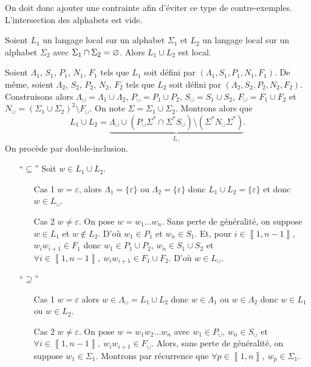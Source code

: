 On doit donc ajouter une contrainte afin d'éviter ce type de contre-exemples.
L'intersection des alphabets est vide.

\begin{prop}
	Soient $L_1$\/ un langage local sur un alphabet $\Sigma_1$\/ et $L_2$\/ un langage local sur un alphabet $\Sigma_2$\/ avec $\Sigma_1 \cap \Sigma_2 = \varnothing$.
	Alors $L_1 \cup L_2$\/ est local.
\end{prop}

\begin{prv}
	Soient $\Lambda_1$, $S_1$, $P_1$, $N_1$, $F_1$\/ tels que $L_1$\/ soit défini par $(\Lambda_1, S_1, P_1, N_1, F_1)$.
	De même, soient $\Lambda_2$, $S_2$, $P_2$, $N_2$, $F_2$\/ tels que $L_2$\/ soit défini par $(\Lambda_2, S_2, P_2, N_2, F_2)$.
	Construisons alors $\Lambda_\cup = \Lambda_1 \cup \Lambda_2$, $P_\cup = P_1 \cup P_2$, $S_\cup = S_1 \cup S_2$, $F_\cup = F_1 \cup F_2$ et $N_\cup = (\Sigma_1 \cup \Sigma_2)^2 \setminus F_\cup$. On note $\Sigma = \Sigma_1 \cup \Sigma_2$.
	Montrons alors que \[
		L_1 \cup L_2 = \underbrace{\Lambda_\cup \cup (P_\cup \Sigma^* \cap \Sigma^* S_\cup) \setminus (\Sigma^* N_\cup \Sigma^*)}_{L_\cup}
	.\]
	On procède par double-inclusion.
	\begin{itemize}
		\item[``$\subseteq$''] Soit $w \in L_1 \cup L_2$.
			\begin{itemize}
				\item[{\sc Cas 1}] $w = \varepsilon$, alors $\Lambda_1 = \{\varepsilon\}$\/ ou $\Lambda_2 = \{\varepsilon\}$\/ donc $L_1 \cup L_2 = \{\varepsilon\}$\/ et donc $w \in L_\cup$.
				\item[{\sc Cas 2}] $w \neq \varepsilon$. On pose $w = w_1\ldots w_n$. Sans perte de généralité, on suppose $w \in L_1$\/ et $w \not\in L_2$. D'où $w_1 \in P_1$\/ et $w_n \in S_1$.
					Et, pour $i \in \left\llbracket 1,n-1 \right\rrbracket$, $w_iw_{i+1} \in F_1$\/ donc $w_1 \in P_1 \cup P_2$, $w_n  \in S_1 \cup S_2$\/ et $\forall i \in \left\llbracket 1,n-1 \right\rrbracket,\: w_i w_{i+1} \in F_1 \cup F_2$.
					D'où $w \in L_\cup$.
			\end{itemize}
		\item[``$\supseteq$'']
			\begin{itemize}
				\item[{\sc Cas 1}] $w = \varepsilon$\/ alors $w \in \Lambda_\cup = L_1 \cup L_2$\/ donc $w \in \Lambda_1$\/ ou $w \in \Lambda_2$\/ donc $w \in L_1$\/ ou $w \in L_2$.
				\item[{\sc Cas 2}] $w \neq \varepsilon$. On pose $w = w_1 w_2 \ldots w_n$\/ avec $w_1 \in P_\cup$, $w_n \in S_\cup$\/ et $\forall  i \in \left\llbracket 1,n-1 \right\rrbracket,\: w_i w_{i+1} \in F_\cup$. Alors, sans perte de généralité, on suppose $w_1 \in \Sigma_1$. Montrons par récurrence que $\forall p \in \left\llbracket 1,n \right\rrbracket,\: w_p \in \Sigma_1$.

\end{itemize}
\end{itemize}
\end{prv}
